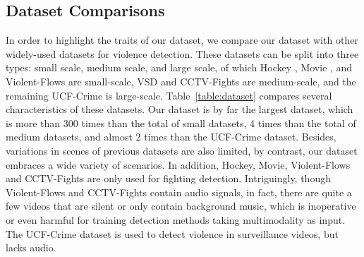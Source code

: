 \documentclass[runningheads]{llncs}
\begin{document}
\subsection{Dataset Comparisons}
\setlength{\tabcolsep}{4pt}
\begin{table}[t]
\begin{center}
\caption{Comparisons of different violence datasets.means quite a few videos are silent or only contain background music.}
\label{table:dataset}
\end{center}
\end{table}
\setlength{\tabcolsep}{1.4pt}
In order to highlight the traits of our dataset, we compare our dataset with other widely-used datasets for violence detection. These datasets can be split into three types: small scale, medium scale, and large scale, of which Hockey \cite{nievas2011violence}, Movie  \cite{nievas2011violence}, and Violent-Flows  \cite{hassner2012violent} are small-scale, VSD \cite{demarty2015vsd} and CCTV-Fights \cite{perez2019detection} are medium-scale, and the remaining UCF-Crime \cite{sultani2018real} is large-scale. Table~\ref{table:dataset} compares several characteristics of these datasets. Our dataset is by far the largest dataset, which is more than 300 times than the total of small datasets, 4 times than the total of medium datasets, and almost 2 times than the UCF-Crime dataset. Besides, variations in scenes of previous datasets are also limited, by contrast, our dataset embraces a wide variety of scenarios. In addition, Hockey, Movie, Violent-Flows and CCTV-Fights are only used for fighting detection. Intriguingly, though Violent-Flows and CCTV-Fights contain audio signals, in fact, there are quite a few videos that are silent or only contain background music, which is inoperative or even harmful for training detection methods taking multimodality as input. The UCF-Crime dataset is used to detect violence in surveillance videos, but lacks audio.
\end{document}
